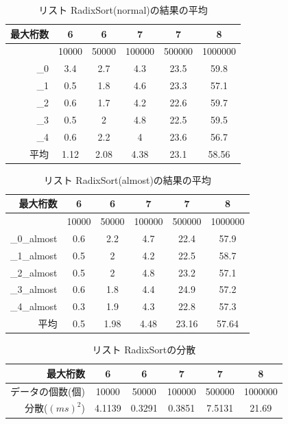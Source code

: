 \documentclass[a4j,dvipdfmx]{jsreport}
\begin{document}
\begin{table}[hbtp]
\caption{リスト RadixSort(normal)の結果の平均}
\label{table:data_type}
\centering
\begin{tabular}{|r||cc|cc|c|}
\hline
最大桁数 & 6 & 6 & 7 & 7 & 8 \\ \hline \hline
 & 10000 & 50000 & 100000 & 500000 & 1000000 \\ \hline
\_0 & 3.4 & 2.7 & 4.3 & 23.5 & 59.8 \\
\_1 & 0.5 & 1.8 & 4.6 & 23.3 & 57.1 \\
\_2 & 0.6 & 1.7 & 4.2 & 22.6 & 59.7 \\
\_3 & 0.5 & 2 & 4.8 & 22.5 & 59.5 \\
\_4 & 0.6 & 2.2 & 4 & 23.6 & 56.7 \\ \hline
平均 & 1.12 & 2.08 & 4.38 & 23.1 & 58.56 \\
\hline
\end{tabular}
\end{table}

\begin{table}[hbtp]
\caption{リスト RadixSort(almost)の結果の平均}
\label{table:data_type}
\centering
\begin{tabular}{|r||cc|cc|c|}
\hline
最大桁数 & 6 & 6 & 7 & 7 & 8 \\ \hline \hline
 & 10000 & 50000 & 100000 & 500000 & 1000000 \\ \hline
\_0\_almost & 0.6 & 2.2 & 4.7 & 22.4 & 57.9 \\
\_1\_almost & 0.5 & 2 & 4.2 & 22.5 & 58.7 \\
\_2\_almost & 0.5 & 2 & 4.8 & 23.2 & 57.1 \\
\_3\_almost & 0.6 & 1.8 & 4.4 & 24.9 & 57.2 \\
\_4\_almost & 0.3 & 1.9 & 4.3 & 22.8 & 57.3 \\ \hline
平均 & 0.5 & 1.98 & 4.48 & 23.16 & 57.64 \\
\hline
\end{tabular}
\end{table}

\begin{table}[hbtp]
\caption{リスト RadixSortの分散}
\label{table:data_type}
\centering
\begin{tabular}{|r||cc|cc|c|}
\hline
最大桁数 & 6 & 6 & 7 & 7 & 8 \\ \hline \hline
データの個数(個) & 10000 & 50000 & 100000 & 500000 & 1000000 \\ \hline
分散($(ms)^2$) & 4.1139 & 0.3291 & 0.3851 & 7.5131 & 21.69 \\
\hline
\end{tabular}
\end{table}
\end{document}
